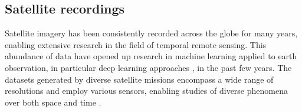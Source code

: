 \documentclass{CUP-JNL-DTM}%
\newcommand{\AOc}[1]{\textcolor{cyan}{[\textbf{Art}: #1]}}
\theoremstyle{definition}
\numberwithin{equation}{section}
\begin{document}
\begin{table*}[ht]
{\begin{fntable}
\begin{tabular}{p{1.5cm} | p{0.4cm} | p{1cm} | p{1.3cm} | p{1.2cm} : p{1.1cm} | p{0.4cm} | p{0.7cm} | p{0.8cm} | p{1cm} | p{1.1cm}}
\bottomrule

\end{tabular}
\end{fntable}}
\label{tab:aerial}
\end{table*}









\subsection{Satellite recordings}
\label{sec:review_satellite}


Satellite imagery has been consistently recorded across the globe for many years, enabling extensive research in the field of temporal remote sensing.
This abundance of data have opened up research in machine learning applied to earth observation, in particular deep learning approaches \cite{campsvalls_deep_2021}, in the past few years.
The datasets generated by diverse satellite missions encompass a wide range of resolutions and employ various sensors, enabling studies of diverse phenomena over both space and time \cite{swain_spatio-temporal_2023}.
\end{document}
